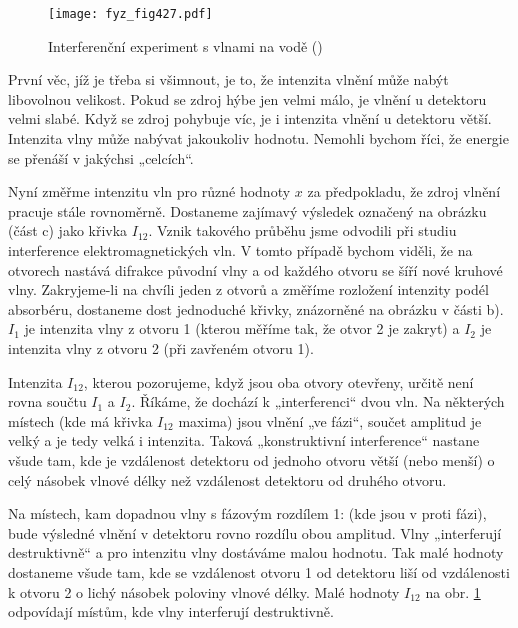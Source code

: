     \begin{figure}[hb!] %
      \centering
      \texttt{[image: fyz\_fig427.pdf]}
      \caption{Interferenční experiment s vlnami na vodě (\cite[s.~697]{Feynman01})}
      \label{fyz:fig427}
    \end{figure}

    První věc, jíž je třeba si všimnout, je to, že intenzita vlnění může nabýt libovolnou velikost.
    Pokud se zdroj hýbe jen velmi málo, je vlnění u detektoru velmi slabé. Když se zdroj pohybuje
    víc, je i intenzita vlnění u detektoru větší. Intenzita vlny může nabývat jakoukoliv hodnotu.
    Nemohli bychom říci, že energie se přenáší v jakýchsi „celcích“.
    
    Nyní změřme intenzitu vln pro různé hodnoty \(x\) za předpokladu, že zdroj vlnění pracuje stále
    rovnoměrně. Dostaneme zajímavý výsledek označený na obrázku (část c) jako křivka \(I_{12}\).
    Vznik takového průběhu jsme odvodili při studiu interference elektromagnetických vln. V tomto
    případě bychom viděli, že na otvorech nastává difrakce původní vlny a od každého otvoru se šíří
    nové kruhové vlny. Zakryjeme-li na chvíli jeden z otvorů a změříme rozložení intenzity podél
    absorbéru, dostaneme dost jednoduché křivky, znázorněné na obrázku v části b). \(I_1\) je
    intenzita vlny z otvoru 1 (kterou měříme tak, že otvor 2 je zakryt) a \(I_2\) je intenzita vlny
    z otvoru 2 (při zavřeném otvoru 1).

    Intenzita \(I_{12}\), kterou pozorujeme, když jsou oba otvory otevřeny, určitě není rovna součtu
    \(I_1\) a \(I_2\). Říkáme, že dochází k „interferenci“ dvou vln. Na některých místech (kde má
    křivka \(I_{12}\) maxima) jsou vlnění „ve fázi“, součet amplitud je velký a je tedy velká i
    intenzita. Taková „konstruktivní interference“ nastane všude tam, kde je vzdálenost detektoru od
    jednoho otvoru větší (nebo menší) o celý násobek vlnové délky než vzdálenost detektoru od
    druhého otvoru.

    Na místech, kam dopadnou vlny s fázovým rozdílem 1: (kde jsou v proti fázi), bude výsledné
    vlnění v detektoru rovno rozdílu obou amplitud. Vlny „interferují destruktivně“ a pro intenzitu
    vlny dostáváme malou hodnotu. Tak malé hodnoty dostaneme všude tam, kde se vzdálenost otvoru 1
    od detektoru liší od vzdálenosti k otvoru 2 o lichý násobek poloviny vlnové délky. Malé hodnoty
    \(I_{12}\) na obr. \ref{fyz:fig427} odpovídají místům, kde vlny interferují destruktivně. 

